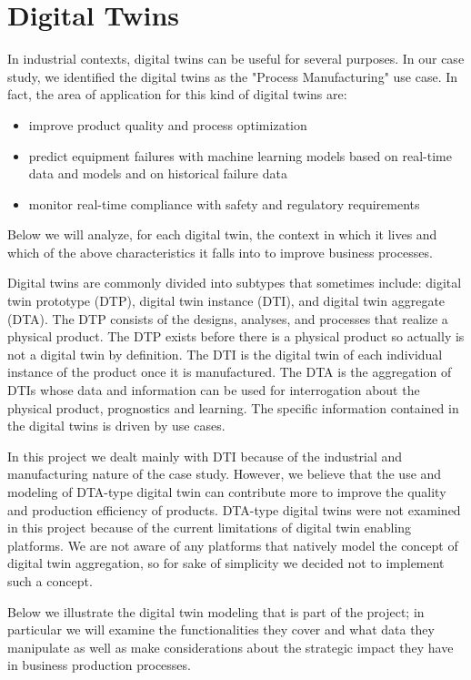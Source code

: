 \chapter{Digital Twins}
In industrial contexts, digital twins can be useful for several purposes.
In our case study, we identified the digital twins as the "Process Manufacturing" use case.
In fact, the area of application for this kind of digital twins are:
\begin{itemize}
    \item improve product quality and process optimization
    \item predict equipment failures with machine learning models based on real-time data and models and on historical failure data
    \item monitor real-time compliance with safety and regulatory requirements
\end{itemize}
Below we will analyze, for each digital twin, the context in which it lives and which of the above characteristics it falls into to improve business processes.

Digital twins are commonly divided into subtypes that sometimes include: digital twin prototype (DTP), digital twin instance (DTI), and digital twin aggregate (DTA).
The DTP consists of the designs, analyses, and processes that realize a physical product.
The DTP exists before there is a physical product so actually is not a digital twin by definition.
The DTI is the digital twin of each individual instance of the product once it is manufactured.
The DTA is the aggregation of DTIs whose data and information can be used for interrogation about the physical product, prognostics and learning.
The specific information contained in the digital twins is driven by use cases.

In this project we dealt mainly with DTI because of the industrial and manufacturing nature of the case study.
However, we believe that the use and modeling of DTA-type digital twin can contribute more to improve the quality and production efficiency of products.
DTA-type digital twins were not examined in this project because of the current limitations of digital twin enabling platforms.
We are not aware of any platforms that natively model the concept of digital twin aggregation, so for sake of simplicity we decided not to implement such a concept.

Below we illustrate the digital twin modeling that is part of the project; in particular we will examine the functionalities they cover and what data they
manipulate as well as make considerations about the strategic impact they have in business production processes.


